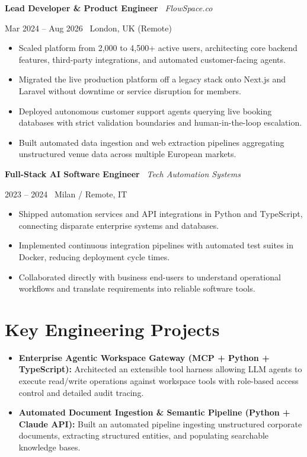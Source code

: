 \documentclass[a4paper,10pt]{article}
\newcommand{\role}[4]{%
  \vspace{2pt}\noindent
  \begin{minipage}[t]{0.70\textwidth}\raggedright\textbf{#1} \textbullet\ \textit{#3}\end{minipage}%
  \hfill
  \begin{minipage}[t]{0.28\textwidth}\raggedleft\footnotesize\color{gray}#2 \textbullet\ #4\end{minipage}%
  \vspace{1pt}%
}
\begin{document}
\vspace{3pt}
\role{Lead Developer \& Product Engineer}{Mar 2024 -- Aug 2026}{FlowSpace.co}{London, UK (Remote)}
\begin{itemize}
  \item Scaled platform from 2,000 to 4,500+ active users, architecting core backend features, third-party integrations, and automated customer-facing agents.
  \item Migrated the live production platform off a legacy stack onto Next.js and Laravel without downtime or service disruption for members.
  \item Deployed autonomous customer support agents querying live booking databases with strict validation boundaries and human-in-the-loop escalation.
  \item Built automated data ingestion and web extraction pipelines aggregating unstructured venue data across multiple European markets.
\end{itemize}

\vspace{3pt}
\role{Full-Stack AI Software Engineer}{2023 -- 2024}{Tech Automation Systems}{Milan / Remote, IT}
\begin{itemize}
  \item Shipped automation services and API integrations in Python and TypeScript, connecting disparate enterprise systems and databases.
  \item Implemented continuous integration pipelines with automated test suites in Docker, reducing deployment cycle times.
  \item Collaborated directly with business end-users to understand operational workflows and translate requirements into reliable software tools.
\end{itemize}

\section{Key Engineering Projects}
\begin{itemize}
  \item \textbf{Enterprise Agentic Workspace Gateway (MCP + Python + TypeScript):} Architected an extensible tool harness allowing LLM agents to execute read/write operations against workspace tools with role-based access control and detailed audit tracing.
  \item \textbf{Automated Document Ingestion \& Semantic Pipeline (Python + Claude API):} Built an automated pipeline ingesting unstructured corporate documents, extracting structured entities, and populating searchable knowledge bases.
\end{itemize}
\end{document}
